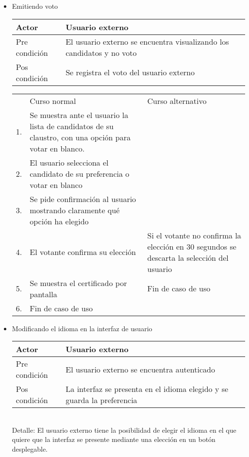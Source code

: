 \begin{itemize}
\bigskip
\item Emitiendo voto
\bigskip
\begin{center}
\begin{tabular}{ll}
Actor & Usuario externo \\
\hline
Pre condición & El usuario externo se encuentra visualizando los candidatos y no voto\\
\hline
Pos condición & Se registra el voto del usuario externo\\
\hline
\end{tabular}
\medskip
\begin{tabular}{c p{4cm}|p{4cm}}
 & Curso normal & Curso alternativo \\
 1. & Se muestra ante el usuario la lista de candidatos de su claustro, con una opción para votar en blanco. &  \\
 2. & El usuario selecciona el candidato de su preferencia o votar en blanco & \\
 3. & Se pide confirmación al usuario mostrando claramente qué opción ha elegido & \\
 4. & El votante confirma su elección & Si el votante no confirma la elección en 30 segundos se descarta la selección del usuario \\
 5. & Se muestra el certificado por pantalla & Fin de caso de uso \\
 6. & Fin de caso de uso & \\ 
\end{tabular}
\end{center}




\bigskip
\item Modificando el idioma en la interfaz de usuario
\bigskip
\begin{center}
\begin{tabular}{ll}
Actor & Usuario externo \\
\hline
Pre condición & El usuario externo se encuentra autenticado \\
\hline
Pos condición & La interfaz se presenta en el idioma elegido y se guarda la preferencia\\
\hline
\end{tabular}
\medskip
        \\
Detalle: El usuario externo tiene la posibilidad de elegir el idioma en el que quiere que la interfaz se presente mediante una elección en un botón desplegable.
\end{center}






\end{itemize}
